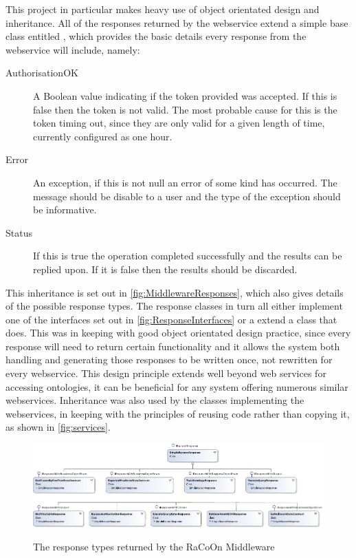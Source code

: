This project in particular makes heavy use of object orientated design and inheritance. All of the responses returned by the webservice extend a simple base class entitled , which provides the basic details every response from the webservice will include, namely:
\begin{description}
    \item[AuthorisationOK] A Boolean value indicating if the token provided was accepted. If this is false then the token is not valid. The most probable cause for this is the token timing out, since they are only valid for a given length of time, currently configured as one hour.
    \item[Error] An exception, if this is not null an error of some kind has occurred. The message should be disable to a user and the type of the exception should be informative.
    \item[Status] If this is true the operation completed successfully and the results can be replied upon. If it is false then the results should be discarded. 
\end{description}

This inheritance is set out in \autoref{fig:MiddlewareResponses}, which also gives details of the possible response types. The response classes in turn all either implement one of the interfaces set out in \autoref{fig:ResponseInterfaces} or a extend a class that does. This was in keeping with good object orientated design practice, since every response will need to return certain functionality and it allows the system both handling and generating those responses to be written once, not rewritten for every webservice. This design principle extends well beyond web services for accessing ontologies, it can be beneficial for any system offering numerous similar webservices. Inheritance was also used by the classes implementing the webservices, in keeping with the principles of reusing code rather than copying it, as shown in \autoref{fig:services}.

 \begin{figure}
\myfloatalign
{\includegraphics[width=\linewidth]{gfx/MiddlewareServicesClassesResponseOnly}} 
\caption{The response types returned by the RaCoOn Middleware}
\label{fig:MiddlewareResponses}
\end{figure}

